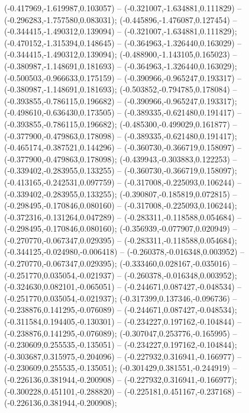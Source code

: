 (-0.417969,-1.619987,0.103057) -- (-0.321007,-1.634881,0.111829) -- (-0.296283,-1.757580,0.083031);
 (-0.445896,-1.476087,0.127454) -- (-0.344415,-1.490312,0.139094) -- (-0.321007,-1.634881,0.111829);
 (-0.470152,-1.315394,0.148645) -- (-0.364963,-1.326440,0.163029) -- (-0.344415,-1.490312,0.139094);
 (-0.488900,-1.143105,0.165023) -- (-0.380987,-1.148691,0.181693) -- (-0.364963,-1.326440,0.163029);
 (-0.500503,-0.966633,0.175159) -- (-0.390966,-0.965247,0.193317) -- (-0.380987,-1.148691,0.181693);
 (-0.503852,-0.794785,0.178084) -- (-0.393855,-0.786115,0.196682) -- (-0.390966,-0.965247,0.193317);
 (-0.498610,-0.636430,0.173505) -- (-0.389335,-0.621480,0.191417) -- (-0.393855,-0.786115,0.196682);
 (-0.485300,-0.499029,0.161877) -- (-0.377900,-0.479863,0.178098) -- (-0.389335,-0.621480,0.191417);
 (-0.465174,-0.387521,0.144296) -- (-0.360730,-0.366719,0.158097) -- (-0.377900,-0.479863,0.178098);
 (-0.439943,-0.303883,0.122253) -- (-0.339402,-0.283955,0.133255) -- (-0.360730,-0.366719,0.158097);
 (-0.413165,-0.242531,0.097759) -- (-0.317008,-0.225093,0.106244) -- (-0.339402,-0.283955,0.133255);
 (-0.390807,-0.185819,0.072815) -- (-0.298495,-0.170846,0.080160) -- (-0.317008,-0.225093,0.106244);
 (-0.372316,-0.131264,0.047289) -- (-0.283311,-0.118588,0.054684) -- (-0.298495,-0.170846,0.080160);
 (-0.356939,-0.077907,0.020949) -- (-0.270770,-0.067347,0.029395) -- (-0.283311,-0.118588,0.054684);
 (-0.344125,-0.024980,-0.006418) -- (-0.260378,-0.016348,0.003952) -- (-0.270770,-0.067347,0.029395);
 (-0.333460,0.028167,-0.035016) -- (-0.251770,0.035054,-0.021937) -- (-0.260378,-0.016348,0.003952);
 (-0.324630,0.082101,-0.065051) -- (-0.244671,0.087427,-0.048534) -- (-0.251770,0.035054,-0.021937);
 (-0.317399,0.137346,-0.096736) -- (-0.238876,0.141295,-0.076089) -- (-0.244671,0.087427,-0.048534);
 (-0.311584,0.194405,-0.130301) -- (-0.234227,0.197162,-0.104844) -- (-0.238876,0.141295,-0.076089);
 (-0.307047,0.253776,-0.165995) -- (-0.230609,0.255535,-0.135051) -- (-0.234227,0.197162,-0.104844);
 (-0.303687,0.315975,-0.204096) -- (-0.227932,0.316941,-0.166977) -- (-0.230609,0.255535,-0.135051);
 (-0.301429,0.381551,-0.244919) -- (-0.226136,0.381944,-0.200908) -- (-0.227932,0.316941,-0.166977);
 (-0.300228,0.451101,-0.288820) -- (-0.225181,0.451167,-0.237168) -- (-0.226136,0.381944,-0.200908);

